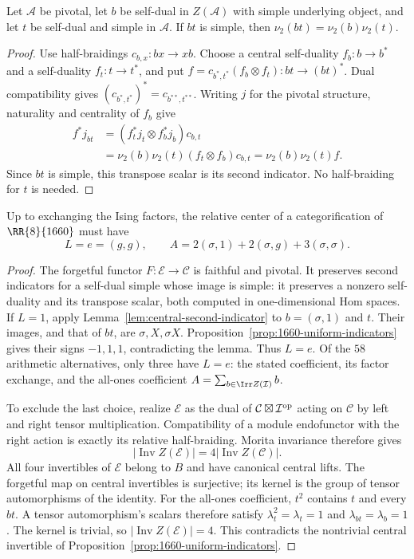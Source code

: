 \begin{lemma}
\label{lem:central-second-indicator}
Let $\mathcal A$ be pivotal, let $b$ be self-dual in $Z(\mathcal A)$
with simple underlying object, and let $t$ be self-dual and simple in
$\mathcal A$. If $bt$ is simple, then
$\nu_2(bt)=\nu_2(b)\nu_2(t)$.
\end{lemma}
\begin{proof}
Use half-braidings $c_{b,x}:bx\to xb$. Choose a central self-duality
$f_b:b\to b^*$ and a self-duality $f_t:t\to t^*$, and put
$f=c_{b^*,t^*}(f_b\otimes f_t):bt\to(bt)^*$.
Dual compatibility gives $(c_{b^*,t^*})^*=c_{b^{**},t^{**}}$.
Writing $j$ for the pivotal structure, naturality and centrality of
$f_b$ give
\begin{align*}
 f^*j_{bt}
 &=(f_t^*j_t\otimes f_b^*j_b)c_{b,t}\\
 &=\nu_2(b)\nu_2(t)(f_t\otimes f_b)c_{b,t}
 =\nu_2(b)\nu_2(t)f.
\end{align*}
Since $bt$ is simple, this transpose scalar is its second indicator.
No half-braiding for $t$ is needed.
\end{proof}

\begin{theorem}
\label{thm:1660-single-relative-ring}
Up to exchanging the Ising factors, the relative center of a
categorification of $\RR{8}{1660}$ must have
\[
 L=e=(g,g),\qquad
 A=2(\sigma,1)+2(\sigma,g)+3(\sigma,\sigma).
\]
\end{theorem}
\begin{proof}
The forgetful functor $F:\mathcal E\to\mathcal C$ is faithful and
pivotal. It preserves second indicators for a self-dual simple whose
image is simple: it preserves a nonzero self-duality and its transpose
scalar, both computed in one-dimensional Hom spaces.
If $L=1$, apply Lemma~\ref{lem:central-second-indicator} to
$b=(\sigma,1)$ and $t$. Their images, and that of $bt$, are
$\sigma,X,\sigma X$. Proposition~\ref{prop:1660-uniform-indicators}
gives their signs $-1,1,1$, contradicting the lemma. Thus $L=e$.
Of the $58$ arithmetic alternatives, only three have $L=e$: the
stated coefficient, its factor exchange, and the all-ones coefficient
$A=\sum_{b\in\Irr Z(\mathcal I)}b$.

To exclude the last choice, realize $\mathcal E$ as the dual of
$\mathcal C\boxtimes\mathcal I^{\rm op}$ acting on $\mathcal C$ by
left and right tensor multiplication. Compatibility of a module
endofunctor with the right action is exactly its relative half-braiding.
Morita invariance therefore gives
\[
 |\operatorname{Inv}Z(\mathcal E)|
       =4|\operatorname{Inv}Z(\mathcal C)|.
\]
All four invertibles of $\mathcal E$ belong to $B$ and have canonical
central lifts. The forgetful map on central invertibles is surjective;
its kernel is the group of tensor automorphisms of the identity.
For the all-ones coefficient, $t^2$ contains $t$ and every $bt$.
A tensor automorphism's scalars therefore satisfy
$\lambda_t^2=\lambda_t=1$ and $\lambda_{bt}=\lambda_b=1$.
The kernel is trivial, so $|\operatorname{Inv}Z(\mathcal E)|=4$.
This contradicts the nontrivial central invertible of
Proposition~\ref{prop:1660-uniform-indicators}.
\end{proof}

